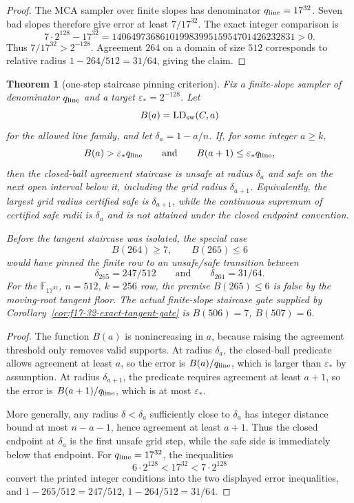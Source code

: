 \documentclass[11pt]{article}
\newtheorem{theorem}{Theorem}
\newcommand{\F}{\mathbb F}
\newcommand{\qline}{q_{\rm line}}
\begin{document}
\begin{proof}
The MCA sampler over finite slopes has denominator \(\qline=17^{32}\).  Seven
bad slopes therefore give error at least \(7/17^{32}\).  The exact integer
comparison is
\[
  7\cdot 2^{128}-17^{32}
  =14064973686101998399515954701426232831>0.
\]
Thus \(7/17^{32}>2^{-128}\).  Agreement \(264\) on a domain of size \(512\)
corresponds to relative radius \(1-264/512=31/64\), giving the claim.
\end{proof}

\begin{theorem}[one-step staircase pinning criterion]
\label{thm:one-step-staircase}
Fix a finite-slope sampler of denominator \(\qline\) and a target
\(\varepsilon_*=2^{-128}\).  Let
\[
  B(a)=\operatorname{LD}_{\rm sw}(C,a)
\]
for the allowed line family, and let \(\delta_a=1-a/n\).  If, for some integer
\(a\ge k\),
\[
  B(a)>\varepsilon_*\qline
  \qquad\text{and}\qquad
  B(a+1)\le \varepsilon_*\qline,
\]
then the closed-ball agreement staircase is unsafe at radius \(\delta_a\) and
safe on the next open interval below it, including the grid radius
\(\delta_{a+1}\).  Equivalently, the largest grid radius certified safe is
\(\delta_{a+1}\), while the continuous supremum of certified safe radii is
\(\delta_a\) and is not attained under the closed endpoint convention.

Before the tangent staircase was isolated, the special case
\[
  B(264)\ge7,
  \qquad
  B(265)\le6
\]
would have pinned the finite row to an unsafe/safe transition between
\[
  \delta_{265}=247/512
  \qquad\text{and}\qquad
  \delta_{264}=31/64.
\]
For the \(\F_{17^{32}}\), \(n=512\), \(k=256\) row, the premise
\(B(265)\le6\) is false by the moving-root tangent floor.  The actual
finite-slope staircase gate supplied by Corollary~\ref{cor:f17-32-exact-tangent-gate}
is \(B(506)=7\), \(B(507)=6\).
\end{theorem}

\begin{proof}
The function \(B(a)\) is nonincreasing in \(a\), because raising the agreement
threshold only removes valid supports.  At radius \(\delta_a\), the closed-ball
predicate allows agreement at least \(a\), so the error is \(B(a)/\qline\), which
is larger than \(\varepsilon_*\) by assumption.  At radius \(\delta_{a+1}\), the
predicate requires agreement at least \(a+1\), so the error is
\(B(a+1)/\qline\), which is at most \(\varepsilon_*\).

More generally, any radius \(\delta<\delta_a\) sufficiently close to
\(\delta_a\) has integer distance bound at most \(n-a-1\), hence agreement at
least \(a+1\).  Thus the closed endpoint at \(\delta_a\) is the first unsafe
grid step, while the safe side is immediately below that endpoint.  For
\(\qline=17^{32}\), the inequalities
\[
  6\cdot2^{128}<17^{32}<7\cdot2^{128}
\]
convert the printed integer conditions into the two displayed error inequalities,
and \(1-265/512=247/512\), \(1-264/512=31/64\).
\end{proof}
\end{document}
